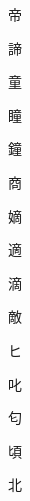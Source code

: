 \begin{spacing}{2.5}
{\Huge \begin{CJK}{UTF8}{min} 帝\end{CJK}}\hspace{0.1cm}
{\Huge \begin{CJK}{UTF8}{min} 諦\end{CJK}}\hspace{0.1cm}
{\Huge \begin{CJK}{UTF8}{min} 童\end{CJK}}\hspace{0.1cm}
{\Huge \begin{CJK}{UTF8}{min} 瞳\end{CJK}}\hspace{0.1cm}
{\Huge \begin{CJK}{UTF8}{min} 鐘\end{CJK}}\hspace{0.1cm}
{\Huge \begin{CJK}{UTF8}{min} 商\end{CJK}}\hspace{0.1cm}
{\Huge \begin{CJK}{UTF8}{min} 嫡\end{CJK}}\hspace{0.1cm}
{\Huge \begin{CJK}{UTF8}{min} 適\end{CJK}}\hspace{0.1cm}
{\Huge \begin{CJK}{UTF8}{min} 滴\end{CJK}}\hspace{0.1cm}
{\Huge \begin{CJK}{UTF8}{min} 敵\end{CJK}}\hspace{0.1cm}
{\Huge \begin{CJK}{UTF8}{min} ヒ\end{CJK}}\hspace{0.1cm}
{\Huge \begin{CJK}{UTF8}{min} 叱\end{CJK}}\hspace{0.1cm}
{\Huge \begin{CJK}{UTF8}{min} 匂\end{CJK}}\hspace{0.1cm}
{\Huge \begin{CJK}{UTF8}{min} 頃\end{CJK}}\hspace{0.1cm}
{\Huge \begin{CJK}{UTF8}{min} 北\end{CJK}}\hspace{0.1cm}

\end{spacing}
